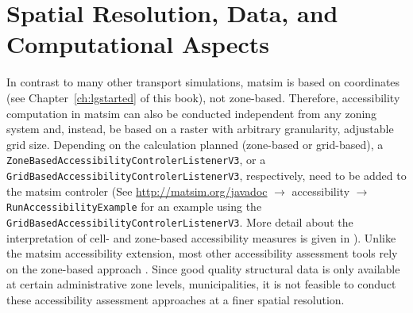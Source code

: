 

\section{Spatial Resolution, Data, and Computational Aspects}
\label{sec:spatial}
In contrast to many other transport simulations, \gls{matsim} is based on coordinates (see Chapter~\ref{ch:lgstarted} of this book),
not zone-based.
Therefore, accessibility computation in \gls{matsim} can also
be conducted independent  from any zoning system and, instead, be based on a raster with arbitrary granularity,
\ie adjustable grid size. Depending on the calculation planned (zone-based or grid-based), a 
\lstinline{ZoneBasedAccessibilityControlerListenerV3}, or a 
\lstinline{GridBasedAccessibilityControlerListenerV3}, respectively, need to be added to the \gls{matsim} controler 
(See \url{http://matsim.org/javadoc} $\to$ accessibility $\to$ \lstinline{RunAccessibilityExample} for an example
using the \lstinline{GridBasedAccessibilityControlerListenerV3}. More detail about the interpretation
of cell- and zone-based accessibility measures is given in \citet{NicolaiNagelHiResAccessibilityMethod}).
Unlike the \gls{matsim} accessibility extension, most other accessibility assessment tools
rely on the zone-based approach 
\citep{CurtisEtAl2013AccessibilityPolicyInnovation, LiuZhu2004AccessibilityAnalyst, BuettnerEtAl2010Erreichbarkeitsatlas}.
Since good quality structural data is only available at certain administrative zone levels, 
\eg municipalities, it is not feasible to conduct these accessibility assessment approaches at a finer 
spatial resolution.

